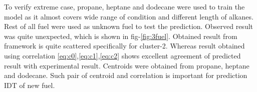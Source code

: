 \documentclass[preprint,12pt]{elsarticle}
\begin{document}
				  		  
				  		    To verify extreme case, propane, heptane and dodecane were used to train the model as it almost covers wide range of condition and different length of alkanes. Rest of all fuel were used as unknown fuel to test the prediction. Observed result was quite unexpected, which is shown in fig-\ref{fig:3fuel}. Obtained result from framework is quite scattered specifically for cluster-2. Whereas result obtained using correlation \ref{eq:c0},\ref{eq:c1},\ref{eq:c2} shows excellent agreement of predicted result with experimental result. Centroids were obtained from propane, heptane and dodecane. Such pair of centroid and correlation is important for prediction IDT of new fuel. 
				  
\end{document}

